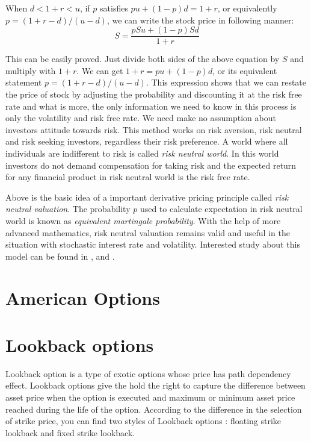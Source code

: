 \documentclass[11pt]{book}
\begin{document}
When $d < 1+r <u$, if $p$ satisfies $pu+(1-p)d= 1+r$, or equivalently $p=(1+r-d)/(u-d)$, we can write the stock price in following manner: 
\begin{equation}
S=\frac{pSu+(1-p)Sd}{1+r}
\end{equation}

This can be easily proved. Just divide both sides of the above equation by $S$ and multiply with $1+r$. We can get $1+r = pu +(1-p)d$, or its equivalent statement $p=(1+r-d)/(u-d)$. This expression shows that we can 
restate the price of stock by adjusting the probability and discounting it at the risk free rate and what is more,     the only information we need to know in this process is only the volatility and risk free rate. We need make no assumption about investors attitude towards risk. This method works on risk aversion, risk neutral and risk seeking investors, regardless their risk preference. A world where all individuals are indifferent to risk is called {\it risk neutral world}. In this world investors do not demand compensation for taking risk and the expected return for any financial product in risk neutral world is the risk free rate.

Above is the basic idea of a important derivative pricing principle called {\it risk neutral valuation}. The probability $p$ used to calculate expectation in risk neutral world is known as {\it equivalent martingale probability}. With the help of more advanced mathematics, risk neutral valuation remains valid and useful in the situation with stochastic interest rate and volatility. Interested study about this model can be found in \cite{HarrisonKreps1979}, \cite{Harrison1981} and \cite{Kreps1981}.



\section{American Options}

\section{Lookback options}

Lookback option is a type of exotic options whose price has path dependency effect. 
Lookback options give the hold the right to capture the difference between asset price when the option is executed and maximum or minimum asset price reached during the life of the option.  According to the difference in the selection of strike price, you can find two styles of Lookback options : floating strike lookback and fixed strike lookback.
\end{document}

